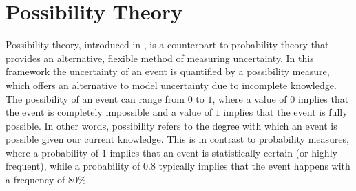 \documentclass[12pt,a4paper]{report}
\begin{document}
%
%
%
\section{Possibility Theory}

Possibility theory, introduced in \cite{ZADEH19999}, is a counterpart to probability theory that provides an alternative, flexible method of measuring uncertainty. In this framework the uncertainty of an event is quantified by a possibility measure, which offers an alternative to model uncertainty due to incomplete knowledge. The possibility of an event can range from $0$ to $1$, where a value of $0$ implies that the event is completely impossible and a value of $1$ implies that the event is fully possible. In other words, possibility refers to the degree with which an event is possible given our current knowledge. This is in contrast to probability measures, where a probability of $1$ implies that an event is statistically certain (or highly frequent), while a probability of $0.8$ typically implies that the event happens with a frequency of 80\%. 
\end{document}
